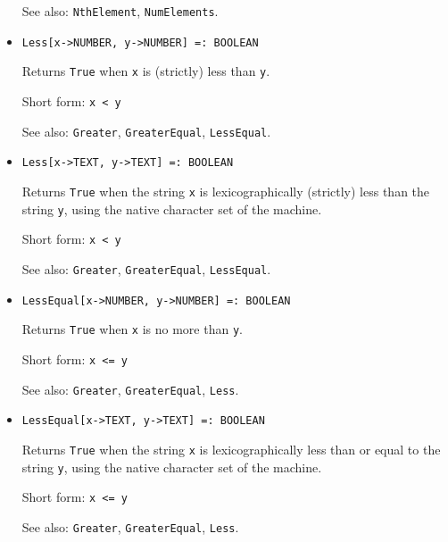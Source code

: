 \begin{itemize}
{\it for all types} {\tt T}
\bd
Returns the number of elements in \verb+list+.
\item
[See also:] \verb+NthElement+, \verb+NumElements+.
\ed

\item{}
\protect \large \begin{verbatim}
Less[x->NUMBER, y->NUMBER] =: BOOLEAN 
\end{verbatim}\normalsize

\bd
Returns \verb+True+ when \verb+x+ is (strictly) less than \verb+y+.
\item [Short form:] \verb+x < y+
\item [See also:] \verb+Greater+, \verb+GreaterEqual+, \verb+LessEqual+.
\ed

\item{}
\protect \large \begin{verbatim}
Less[x->TEXT, y->TEXT] =: BOOLEAN 
\end{verbatim}\normalsize

\bd
Returns \verb+True+ when the string \verb+x+ is lexicographically (strictly)
less than
the string \verb+y+, using the native character set of the machine.
\item [Short form:] \verb+x < y+
\item [See also:] \verb+Greater+, \verb+GreaterEqual+, \verb+LessEqual+.
\ed

\item{}
\protect \large \begin{verbatim}
LessEqual[x->NUMBER, y->NUMBER] =: BOOLEAN 
\end{verbatim}\normalsize

\bd
Returns \verb+True+ when \verb+x+ is no more than \verb+y+.
\item [Short form:] \verb+x <= y+
\item [See also:] \verb+Greater+, \verb+GreaterEqual+, \verb+Less+.
\ed

\item{}
\protect \large \begin{verbatim}
LessEqual[x->TEXT, y->TEXT] =: BOOLEAN 
\end{verbatim}\normalsize

\bd
Returns \verb+True+ when the string \verb+x+ is lexicographically less than
or equal to the string \verb+y+, using the native character set of the machine.
\item [Short form:] \verb+x <= y+
\item [See also:] \verb+Greater+, \verb+GreaterEqual+, \verb+Less+.
\ed


\end{itemize}
